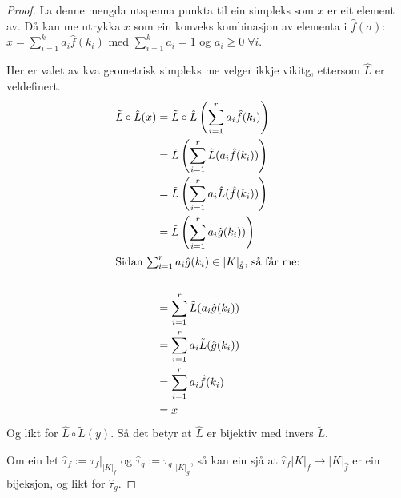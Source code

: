 \documentclass[a4paper, titlepage, 12pt, norsk]{article}
\theoremstyle{plain}
\theoremstyle{definition}
\newcommand{\gr}[1]{ \lvert #1 \rvert } %
\begin{document}
\begin{proof}
	La denne mengda utspenna punkta til ein simpleks som $x$ er eit element av. Då kan me utrykka $x$ som ein konveks kombinasjon av elementa i $\hat{f}(\sigma)$: $x=\sum_{i=1}^ka_i\hat{f}(k_i)$ med $\sum_{i=1}^ka_i=1$ og $a_i\geq0\; \forall i$. 
	
	Her er valet av kva geometrisk simpleks me velger ikkje vikitg, ettersom $\hat{L}$ er veldefinert.
	\begin{align*}
		\tilde{L}\circ \hat{L}(x) &= \tilde{L}\circ \hat{L}\left(\sum_{i=1}^ra_i\hat{f}(k_i)\right) \\
		&= \tilde{L}\left(\sum_{i=1}^r\hat{L}(a_i\hat{f}(k_i))\right) \\
		&= \tilde{L}\left(\sum_{i=1}^ra_i\hat{L}(\hat{f}(k_i))\right) \\
		&= \tilde{L}\left(\sum_{i=1}^ra_i\hat{g}(k_i))\right) \\
		\intertext{Sidan $\sum_{i=1}^ra_i\hat{g}(k_i)\in\gr{K}_{\hat{g}}$, så får me:} \\
		&= \sum_{i=1}^r\tilde{L}(a_i\hat{g}(k_i)) \\
		&= \sum_{i=1}^ra_i\tilde{L}(\hat{g}(k_i)) \\
		&= \sum_{i=1}^ra_i\hat{f}(k_i) \\
		&= x
	\end{align*}
	Og likt for $\hat{L}\circ\tilde{L}(y)$.
	Så det betyr at $\hat{L}$ er bijektiv med invers $\tilde{L}$.
	
	Om ein let $\hat{\tau}_f:=\tau_f|_{\gr{K}_f}$ og $\hat{\tau}_g:=\tau_g|_{\gr{K}_g}$, så kan ein sjå at $\hat{\tau}_f\gr{K}_f\to\gr{K}_{\hat{f}}$ er ein bijeksjon, og likt for $\hat{\tau}_g$.
	

\end{proof}
\end{document}
